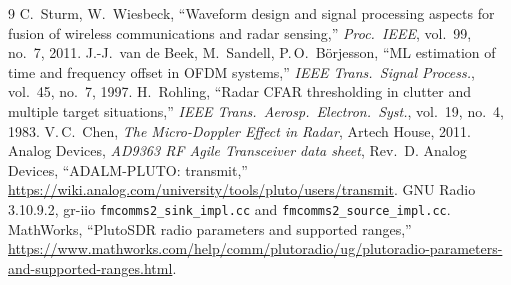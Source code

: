 \documentclass[10pt,a4paper]{article}
\newcommand{\code}[1]{\texttt{#1}}
\begin{document}
\begin{thebibliography}{9}\small
{} C.~Sturm, W.~Wiesbeck, ``Waveform design and signal processing aspects for fusion of wireless
communications and radar sensing,'' \emph{Proc.\ IEEE}, vol.~99, no.~7, 2011.
 J.-J.~van de Beek, M.~Sandell, P.\,O.~B\"orjesson, ``ML estimation of time and frequency offset
in OFDM systems,'' \emph{IEEE Trans.\ Signal Process.}, vol.~45, no.~7, 1997.
 H.~Rohling, ``Radar CFAR thresholding in clutter and multiple target situations,''
\emph{IEEE Trans.\ Aerosp.\ Electron.\ Syst.}, vol.~19, no.~4, 1983.
 V.\,C.~Chen, \emph{The Micro-Doppler Effect in Radar}, Artech House, 2011.
 Analog Devices, \emph{AD9363 RF Agile Transceiver data sheet}, Rev.~D.
 Analog Devices, ``ADALM-PLUTO: transmit,'' \url{https://wiki.analog.com/university/tools/pluto/users/transmit}.
 GNU Radio 3.10.9.2, gr-iio \code{fmcomms2\_sink\_impl.cc} and \code{fmcomms2\_source\_impl.cc}.
 MathWorks, ``PlutoSDR radio parameters and supported ranges,''
\url{https://www.mathworks.com/help/comm/plutoradio/ug/plutoradio-parameters-and-supported-ranges.html}.
\end{thebibliography}
\end{document}
